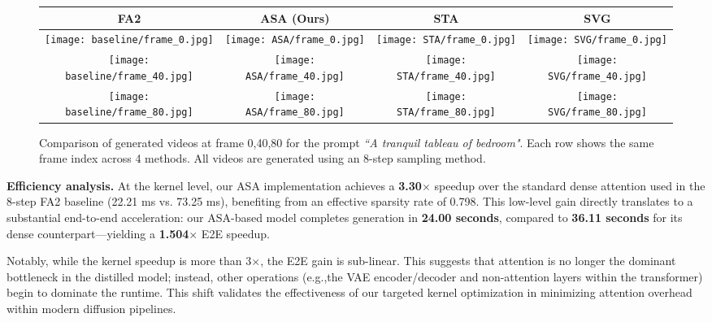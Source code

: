 \documentclass[letterpaper]{article} %
\begin{document}
\begin{figure*}[ht]
\centering
\setlength{\tabcolsep}{2pt}  %
\begin{tabular}{cccc}  %
\toprule
\textbf{FA2} & \textbf{ASA (Ours)} & \textbf{STA} & \textbf{SVG} \\
\midrule
\texttt{[image: baseline/frame\_0.jpg]} &
\texttt{[image: ASA/frame\_0.jpg]} &
\texttt{[image: STA/frame\_0.jpg]} &
\texttt{[image: SVG/frame\_0.jpg]} \\
\texttt{[image: baseline/frame\_40.jpg]} &
\texttt{[image: ASA/frame\_40.jpg]} &
\texttt{[image: STA/frame\_40.jpg]} &
\texttt{[image: SVG/frame\_40.jpg]} \\
\texttt{[image: baseline/frame\_80.jpg]} &
\texttt{[image: ASA/frame\_80.jpg]} &
\texttt{[image: STA/frame\_80.jpg]} &
\texttt{[image: SVG/frame\_80.jpg]} \\
\bottomrule
\end{tabular}
\caption{Comparison of generated videos at frame 0,40,80 for the prompt \textit{``A tranquil tableau of bedroom"}. Each row shows the same frame index across 4 methods. All videos are generated using an 8-step sampling method.}

\label{fig:SSIM_compare}
\end{figure*}
\noindent\textbf{Efficiency analysis.}
At the kernel level, our ASA implementation achieves a \textbf{3.30$\times$} speedup over the standard dense attention used in the 8-step FA2 baseline (22.21 ms vs. 73.25 ms), benefiting from an effective sparsity rate of 0.798. This low-level gain directly translates to a substantial end-to-end acceleration: our ASA-based model completes generation in \textbf{24.00 seconds}, compared to \textbf{36.11 seconds} for its dense counterpart—yielding a \textbf{1.504$\times$} E2E speedup.

Notably, while the kernel speedup is more than 3$\times$, the E2E gain is sub-linear. This suggests that attention is no longer the dominant bottleneck in the distilled model; instead, other operations (e.g.,the VAE encoder/decoder and non-attention layers within the transformer) begin to dominate the runtime. This shift validates the effectiveness of our targeted kernel optimization in minimizing attention overhead within modern diffusion pipelines.
\end{document}
